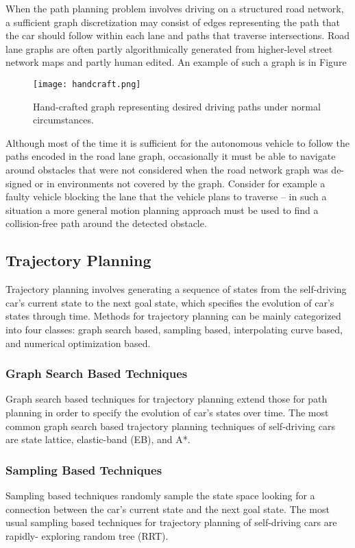 When the path planning problem involves driving on a structured road network, a
sufficient graph discretization may consist of edges representing the path that
the car should follow within each lane and paths that traverse intersections.
Road lane graphs are often partly algorithmically generated from higher-level
street network maps and partly human edited. An example of such a graph is in
Figure

\begin{figure}[H]
    \centering
    \texttt{[image: handcraft.png]}
    \caption{Hand-crafted  graph  representing  desired driving paths under normal circumstances.}
    \label{fig:handcraft}
\end{figure}


Although most of the time it is sufficient for the autonomous vehicle to follow
the paths encoded in the road lane graph, occasionally it must be able to
navigate around obstacles that were not considered when the road network graph
was de- signed or in environments not covered by the graph. Consider for example
a faulty vehicle blocking the lane that the vehicle plans to traverse – in such
a situation a more general motion planning approach must be used to find a
collision-free path around the detected obstacle.

\subsection{Trajectory Planning}

Trajectory planning involves generating a sequence of states from the
self-driving car’s current state to the next goal state, which specifies the
evolution of car’s states through time. Methods for trajectory planning can be
mainly categorized into four classes: graph search based, sampling based,
interpolating curve based, and numerical optimization based.

\subsubsection{Graph Search Based Techniques}
Graph search based techniques for trajectory planning extend those for path
planning in order to specify the evolution of car’s states over time. The most
common graph search based trajectory planning techniques of self-driving cars
are state lattice, elastic-band (EB), and A*.

\subsubsection{Sampling Based Techniques}
Sampling based techniques randomly sample the state space looking for a
connection between the car’s current state and the next goal state. The most
usual sampling based techniques for trajectory planning of self-driving cars are
rapidly- exploring random tree (RRT).

